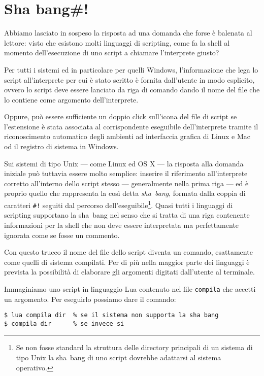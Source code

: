 \section{Sha bang\#!}

Abbiamo lasciato in sospeso la risposta ad una domanda che forse è balenata al
lettore: visto che esistono molti linguaggi di scripting, come fa la shell al
momento dell'esecuzione di uno script a chiamare l'interprete giusto?

Per tutti i sistemi ed in particolare per quelli Windows, l'informazione che
lega lo script all'interprete per cui è stato scritto è fornita dall'utente in
modo esplicito, ovvero lo script deve essere lanciato da riga di comando dando
il nome del file che lo contiene come argomento dell'interprete.

Oppure, può essere sufficiente un doppio click sull'icona del file di script
se l'estensione è stata associata al corrispondente eseguibile dell'interprete
tramite il riconoscimento automatico degli ambienti ad interfaccia grafica di
Linux e Mac od il registro di sistema in Windows.

Sui sistemi di tipo Unix --- come Linux ed OS X --- la risposta alla domanda
iniziale può tuttavia essere molto semplice: inserire il riferimento
all'interprete corretto all'interno dello script stesso --- generalmente nella
prima riga --- ed è proprio quello che rappresenta la così detta
\emph{sha~bang}, formata dalla coppia di caratteri \texttt{\#!} seguiti dal
percorso dell'eseguibile\footnote{Se non fosse standard la struttura delle
  directory principali di un sistema di tipo Unix la sha~bang di uno script
  dovrebbe adattarsi al sistema operativo.}. Quasi tutti i linguaggi di
scripting supportano la sha~bang nel senso che si tratta di una riga contenente
informazioni per la shell che non deve essere interpretata ma perfettamente
ignorata come se fosse un commento.

Con questo trucco il nome del file dello script diventa un comando,
esattamente come quelli di sistema compilati. Per di più nella maggior parte
dei linguaggi è prevista la possibilità di elaborare gli argomenti digitati
dall'utente al terminale.

Immaginiamo uno script in linguaggio Lua contenuto nel file \texttt{compila}
che accetti un argomento. Per eseguirlo possiamo dare il comando:
\begin{Verbatim}
$ lua compila dir  % se il sistema non supporta la sha bang  
$ compila dir      % se invece si
\end{Verbatim}

